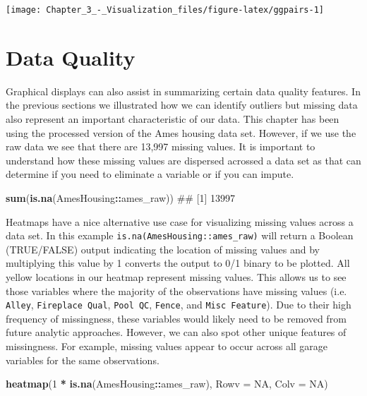 \documentclass[]{article}
\newenvironment{Shaded}{\begin{snugshade}}{\end{snugshade}}
\newcommand{\KeywordTok}[1]{\textcolor[rgb]{0.13,0.29,0.53}{\textbf{#1}}}
\newcommand{\DataTypeTok}[1]{\textcolor[rgb]{0.13,0.29,0.53}{#1}}
\newcommand{\DecValTok}[1]{\textcolor[rgb]{0.00,0.00,0.81}{#1}}
\newcommand{\StringTok}[1]{\textcolor[rgb]{0.31,0.60,0.02}{#1}}
\newcommand{\OtherTok}[1]{\textcolor[rgb]{0.56,0.35,0.01}{#1}}
\newcommand{\OperatorTok}[1]{\textcolor[rgb]{0.81,0.36,0.00}{\textbf{#1}}}
\newcommand{\NormalTok}[1]{#1}
\begin{document}
\begin{center}\texttt{[image: Chapter\_3\_-\_Visualization\_files/figure-latex/ggpairs-1]} \end{center}

\section{Data Quality}\label{data-quality}

Graphical displays can also assist in summarizing certain data quality
features. In the previous sections we illustrated how we can identify
outliers but missing data also represent an important characteristic of
our data. This chapter has been using the processed version of the Ames
housing data set. However, if we use the raw data we see that there are
13,997 missing values. It is important to understand how these missing
values are dispersed acrossed a data set as that can determine if you
need to eliminate a variable or if you can impute.

\begin{Shaded}
\begin{Highlighting}[]
\KeywordTok{sum}\NormalTok{(}\KeywordTok{is.na}\NormalTok{(AmesHousing}\OperatorTok{::}\NormalTok{ames_raw))}
\NormalTok{## [1] 13997}
\end{Highlighting}
\end{Shaded}

Heatmaps have a nice alternative use case for visualizing missing values
across a data set. In this example
\texttt{is.na(AmesHousing::ames\_raw)} will return a Boolean
(TRUE/FALSE) output indicating the location of missing values and by
multiplying this value by 1 converts the output to 0/1 binary to be
plotted. All yellow locations in our heatmap represent missing values.
This allows us to see those variables where the majority of the
observations have missing values (i.e. \texttt{Alley},
\texttt{Fireplace\ Qual}, \texttt{Pool\ QC}, \texttt{Fence}, and
\texttt{Misc\ Feature}). Due to their high frequency of missingness,
these variables would likely need to be removed from future analytic
approaches. However, we can also spot other unique features of
missingness. For example, missing values appear to occur across all
garage variables for the same observations.

\begin{Shaded}
\begin{Highlighting}[]
\KeywordTok{heatmap}\NormalTok{(}\DecValTok{1} \OperatorTok{*}\StringTok{ }\KeywordTok{is.na}\NormalTok{(AmesHousing}\OperatorTok{::}\NormalTok{ames_raw), }\DataTypeTok{Rowv =} \OtherTok{NA}\NormalTok{, }\DataTypeTok{Colv =} \OtherTok{NA}\NormalTok{)}
\end{Highlighting}
\end{Shaded}
\end{document}

